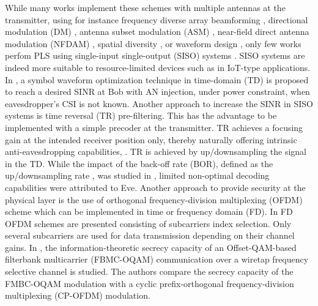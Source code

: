 \documentclass[12pt, draftclsnofoot, onecolumn]{IEEEtran}
\begin{document}
While many works implement these schemes with multiple antennas at the transmitter, using for instance frequency diverse array beamforming \cite{li_qiang_2018_1159254,8078202}, directional modulation (DM) \cite{5159486},  antenna subset modulation (ASM) \cite{6544472}, near-field direct antenna modulation (NFDAM) \cite{4684619,4523120}, spatial diversity \cite{5580113,7070667,8786136,5738303}, or waveform design \cite{9062307}, only few works perfom PLS using single-input single-output (SISO) systems \cite{li2013waveform,9003692,8093595,8093591,xu2018security,li2018artificial,li2017artificial,9049811,7475864,7041552}. SISO systems are indeed more suitable to resource-limited devices such as in IoT-type applications.   In \cite{li2013waveform}, a symbol waveform optimization technique in time-domain (TD) is proposed to reach a desired SINR at Bob with AN injection, under power constraint, when eavesdropper’s CSI is not known. Another approach to increase the SINR in SISO systems is time reversal (TR) pre-filtering. This has the advantage to be implemented with a simple precoder at the transmitter. TR achieves a focusing gain at the intended receiver position only, thereby naturally offering intrinsic anti-eavesdropping capabilities, \cite{9003692,oestges2005characterization}. TR is achieved by up/downsampling the signal in the TD. While the impact of the back-off rate (BOR), defined as the up/downsampling rate \cite{dubois2010use}, was studied in \cite{9003692,9049811}, limited non-optimal decoding capabilities were attributed to Eve. Another approach to provide security at the physical layer is the use of orthogonal frequency-division multiplexing (OFDM) scheme which can be implemented in time or frequency domain (FD). In \cite{8093595,8093591} FD OFDM schemes are presented consisting of subcarriers index selection. Only several subcarriers are used for data transmission depending on their channel gains.  In \cite{9062307}, the information-theoretic secrecy capacity of an Offset-QAM-based filterbank multicarrier (FBMC-OQAM) communication over a wiretap frequency selective channel is studied. The authors compare the secrecy capacity of the FMBC-OQAM modulation with a cyclic prefix-orthogonal frequency-division multiplexing (CP-OFDM) modulation.
\end{document}
